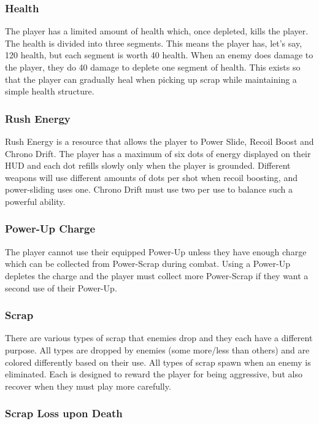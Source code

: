 \documentclass[12pt]{article}
\begin{document}
\subsubsection{Health}

The player has a limited amount of health which, once depleted, kills the player. The health is divided into three segments. This means the player has, let's say, 120 health, but each segment is worth 40 health. When an enemy does damage to the player, they do 40 damage to deplete one segment of health. This exists so that the player can gradually heal when picking up scrap while maintaining a simple health structure. 

\subsubsection{Rush Energy}

Rush Energy is a resource that allows the player to Power Slide, Recoil Boost and Chrono Drift. The player has a maximum of six dots of energy displayed on their HUD and each dot refills slowly only when the player is grounded. Different weapons will use different amounts of dots per shot when recoil boosting, and power-sliding uses one. Chrono Drift must use two per use to balance such a powerful ability. 

\subsubsection{Power-Up Charge}

The player cannot use their equipped Power-Up unless they have enough charge which can be collected from Power-Scrap during combat. Using a Power-Up depletes the charge and the player must collect more Power-Scrap if they want a second use of their Power-Up. 

\subsubsection{Scrap}

There are various types of scrap that enemies drop and they each have a different purpose. All types are dropped by enemies (some more/less than others) and are colored differently based on their use. All types of scrap spawn when an enemy is eliminated. Each is designed to reward the player for being aggressive, but also recover when they must play more carefully. 

\subsubsection{Scrap Loss upon Death}
\end{document}
